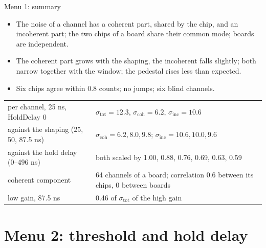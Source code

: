 \documentclass[10pt,aspectratio=169]{beamer}
\begin{document}
\begin{frame}{Menu 1: summary}
\begin{itemize}
\item The noise of a channel has a coherent part, shared by the chip, and an incoherent
  part; the two chips of a board share their common mode; boards are independent.
\item The coherent part grows with the shaping, the incoherent falls slightly; both narrow
  together with the window; the pedestal rises less than expected.
\item Six chips agree within 0.8 counts; no jumps; six blind channels.
\end{itemize}
\medskip
\centering
\small
\begin{tabular}{lp{}}
\toprule
per channel, 25 ns, HoldDelay 0 & $\sigma_\mathrm{tot} = 12.3$, $\sigma_\mathrm{coh} = 6.2$, $\sigma_\mathrm{inc} = 10.6$ \\
against the shaping (25, 50, 87.5 ns) & $\sigma_\mathrm{coh} = 6.2, 8.0, 9.8$; $\sigma_\mathrm{inc} = 10.6, 10.0, 9.6$ \\
against the hold delay (0--496 ns) & both scaled by 1.00, 0.88, 0.76, 0.69, 0.63, 0.59 \\
coherent component & 64 channels of a board; correlation 0.6 between its chips, 0 between boards \\
low gain, 87.5 ns & 0.46 of $\sigma_\mathrm{tot}$ of the high gain \\
\bottomrule
\end{tabular}
\end{frame}

\section{Menu 2: threshold and hold delay}
\end{document}
